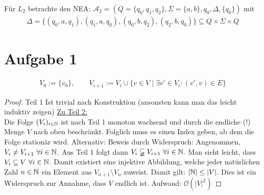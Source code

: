 \documentclass[12pt,a4paper]{article}
\newcommand{\A}{\mathcal{A}}
\begin{document}
\usetikzlibrary{positioning,automata}

Für $L_2$ betrachte den NEA: $\A_2=(Q=\lbrace q_0,q_1,q_2\rbrace,\Sigma=\lbrace a,b\rbrace,q_0,\Delta,\lbrace q_0\rbrace)$ mit
\begin{align*}
\Delta=\lbrace (q_0,a,q_1),(q_1,a,q_0),(q_0,b,q_2),(q_2,b,q_0)\rbrace\subseteq Q\times\Sigma\times Q
\end{align*}

\usetikzlibrary{positioning,automata}


\section*{Aufgabe 1}
\begin{align*}
V_0:=\lbrace v_0\rbrace,\qquad V_{i+1}:=V_i\cup\big\lbrace v\in V\mid\exists v'\in V_i:(v',v)\in E\big\rbrace
\end{align*}
\begin{proof}
Teil 1 Ist trivial nach Konstruktion (ansonsten kann man das leicht induktiv zeigen)\nl
\ul{Zu Teil 2:}\\
Die Folge $(V_i)_{i\in\mathbb{N}}$ ist nach Teil 1 monoton wachsend und durch die endliche (!) Menge $V$ nach oben beschränkt. Folglich muss es einen Index geben, ab dem die Folge stationär wird.\nl
Alternativ: Beweis durch Widerspruch: Angenommen, $V_i\neq V_{i+1}~\forall i\in\mathbb{N}$. Aus Teil 1 folgt dann $V_i\varsubsetneqq V_{i+1}~\forall i\in\mathbb{N}.$ Man sieht leicht, dass $V_i\subseteq V~\forall i\in\mathbb{N}$. Damit existiert eine injektive Abbildung, welche jeder natürlichen Zahl $n\in\mathbb{N}$ ein Element aus $V_{n+1}\setminus V_n$ zuweist. Damit gilt: $|\mathbb{N}|\leq |V|$. Dies ist ein Widerspruch zur Annahme, dass $V$ endlich ist.\nl
Aufwand: $\mathcal{O}(|V|^2)$ %
\end{proof}
\end{document}
